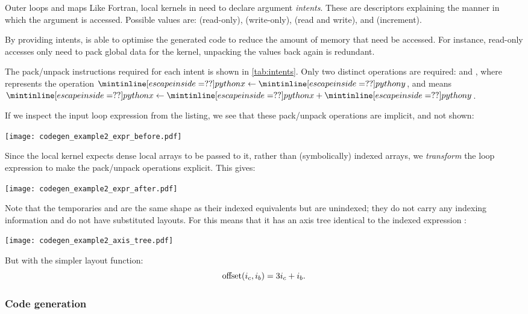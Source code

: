\documentclass[thesis]{subfiles}
\begin{document}
\begin{example}{Outer loops and maps}
Like Fortran, local kernels in  need to declare argument \emph{intents}.
These are descriptors explaining the manner in which the argument is accessed.
Possible values are:  (read-only),  (write-only),  (read and write), and  (increment).

By providing intents,  is able to optimise the generated code to reduce the amount of memory that need be accessed.
For instance, read-only accesses only need to pack global data for the kernel, unpacking the values back again is redundant.

The pack/unpack instructions required for each intent is shown in \cref{tab:intents}.
Only two distinct operations are required:  and , where  represents the operation $\pycode{x} \gets \pycode{y}$, and  means $\pycode{x} \gets \pycode{x} + \pycode{y}$.

If we inspect the input loop expression from the listing, we see that these pack/unpack operations are implicit, and not shown:
\begin{center}
  \texttt{[image: codegen\_example2\_expr\_before.pdf]}
\end{center}
Since the local kernel expects dense local arrays to be passed to it, rather than (symbolically) indexed arrays, we \emph{transform} the loop expression to make the pack/unpack operations explicit.
This gives:
\begin{center}
  \texttt{[image: codegen\_example2\_expr\_after.pdf]}
\end{center}
\noindent
Note that the temporaries  and  are the same shape as their indexed equivalents but are unindexed; they do not carry any indexing information and do not have substituted layouts.
For  this means that it has an axis tree identical to the indexed expression :
\begin{center}
  \texttt{[image: codegen\_example2\_axis\_tree.pdf]}
\end{center}
But with the simpler layout function:
\begin{equation}
  \textnormal{offset}(i_c, i_b) = 3 i_c + i_b.
  \label{eq:temporary_layout}
\end{equation}

\subsubsection{Code generation}


\end{example}
\end{document}
